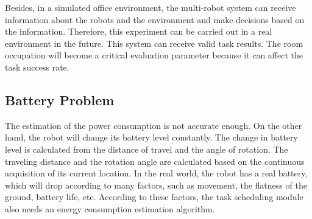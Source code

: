 Besides, in a simulated office environment, the multi-robot system can receive information about the robots and the environment and make decisions based on the information. Therefore, this experiment can be carried out in a real environment in the future.  This system can receive valid task results. The room occupation will become a critical evaluation parameter because it can affect the task success rate. 


\subsection*{Battery Problem}
The estimation of the power consumption is not accurate enough. 
On the other hand, the robot will change its battery level constantly. The change in battery level is calculated from the distance of travel and the angle of rotation. The traveling distance and the rotation angle are calculated based on the continuous acquisition of its current location.
In the real world, the robot has a real battery, which will drop according to many factors, such as movement, the flatness of the ground, battery life, etc. According to these factors, the task scheduling module also needs an energy consumption estimation algorithm.


